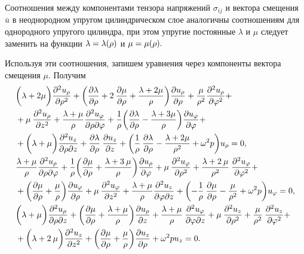 Соотношения между компонентами тензора напряжений $\sigma_{ij}$ и вектора смещения $\bar{u}$ в неоднородном упругом цилиндрическом слое аналогичны соотношениям для однородного упругого цилиндра, при этом упругие постоянные $\lambda$ и $\mu$ следует заменить на функции $\lambda=\lambda(\rho)$ и $\mu=\mu(\rho).$

Используя эти соотношения, запишем уравнения  через компоненты вектора смещения $\mu.$ Получим
\begin{equation}
\begin{aligned}
&\biggl(\lambda+2\mu\biggr)\frac{\partial^2u_{\rho}}{\partial \rho^2}+\biggl(\frac{\partial\lambda}{\partial \rho}+2\:\frac{\partial\mu}{\partial \rho}+\frac{\lambda+2\mu}{\rho}\biggr)\frac{\partial u_{\rho}}{\partial \rho}+\frac{\mu}{\rho^2}\frac{\partial^2 u_{\rho}}{\partial \varphi^2}+\\
&+\mu\:\frac{\partial^2 u_{\rho}}{\partial z^2}+\frac{\lambda+\mu}{\rho}\frac{\partial^2 u_{\varphi}}{\partial \rho\partial\varphi}+\frac{1}{\rho}\biggl(\frac{\partial\lambda}{\partial \rho}-\frac{\lambda+3\mu}{\rho}\biggr)\frac{\partial u_{\varphi}}{\partial\varphi}+\\
&+\biggl(\lambda+\mu\biggr)\frac{\partial^2 u_z}{\partial \rho\partial z}+\frac{\partial\lambda}{\partial \rho}\:\frac{\partial u_z}{\partial z}+\biggl(\frac{1}{\rho}\:\frac{\partial\lambda}{\partial \rho}-\frac{\lambda+2\mu}{\rho^2}+\omega^2 p\biggr)u_{\rho}=0,\\
&\frac{\lambda+\mu}{\rho}\frac{\partial^2u_{\rho}}{\partial \rho\partial\varphi}+\frac{1}{\rho}\biggl(\frac{\partial\mu}{\partial \rho}+\frac{\lambda+3\:\mu}{\rho}\biggr)\frac{\partial u_{\rho}}{\partial\varphi}+\mu\:\frac{\partial^2 u_{\varphi}}{\partial \rho^2}+\frac{\lambda+2\:\mu}{\rho^2}\:\frac{\partial^2 u_{\varphi}}{\partial \varphi^2}+\\
&+\biggl(\frac{\partial\mu}{\partial \rho}+\frac{\mu}{\rho}\biggr)\frac{\partial u_{\varphi}}{\partial \rho}+\mu\:\frac{\partial^2 u_{\varphi}}{\partial z^2}+\frac{\lambda+\mu}{\rho}\frac{\partial^2 u_z}{\partial \varphi\partial z}+\biggl(-\frac{1}{\rho}\:\frac{\partial\mu}{\partial \rho}-\frac{\mu}{\rho^2}+\omega^2 p\biggr)u_{\varphi}=0,\\
&\biggl(\lambda+\mu\biggr)\frac{\partial^2u_{\rho}}{\partial \rho\partial z}+\biggl(\frac{\partial\mu}{\partial \rho}+\frac{\lambda+\mu}{\rho}\biggr)\frac{\partial u_{\rho}}{\partial z}+\frac{\lambda+\mu}{\rho}\:\frac{\partial^2 u_{\varphi}}{\partial \varphi\partial z}+\mu\:\frac{\partial^2 u_z}{\partial \rho^2}+\frac{\mu}{\rho^2}\:\frac{\partial^2 u_z}{\partial {\varphi}^2}+\\
&+\biggl(\lambda+2\:\mu\biggr)\frac{\partial^2 u_z}{\partial z^2}+\biggl(\frac{\partial\mu}{\partial \rho}+\frac{\mu}{\rho}\biggr)\frac{\partial u_z}{\partial \rho}+\omega^2 pu_z=0.
\end{aligned}
\end{equation}

